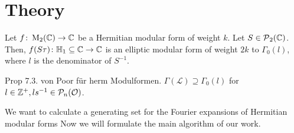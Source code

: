 
\section{Theory}


\begin{lemma}
Let $f \colon \operatorname{M}_2(\mathbb{C}) \rightarrow \mathbb{C}$ be a Hermitian modular form of weight $k$. Let $S \in \operatorname{\mathcal{P}}_2(\mathbb{C})$.
Then, $f(S \tau) \colon \mathbb{H}_1 \subseteq \mathbb{C} \rightarrow \mathbb{C}$ is an elliptic modular form of weight $2k$ to $\Gamma_0(l)$, where $l$ is the denominator of $S^{-1}$.  %
\end{lemma}


\begin{lemma}
Prop 7.3. von Poor für herm Modulformen.
$\Gamma(\mathcal{L}) \supseteq \Gamma_0(l)$ for $l \in \mathbb{Z}^+, ls^{-1} \in \mathcal{P}_n(\mathcal{O})$.
\end{lemma}


We want to calculate a generating set for the Fourier expansions of Hermitian modular forms Now we will formulate the main algorithm of our work.

